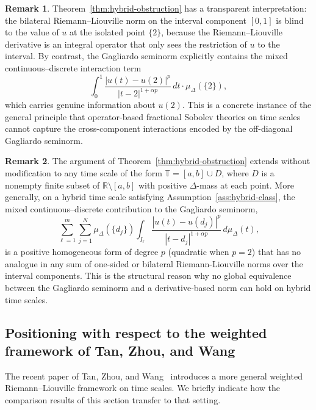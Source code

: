 \documentclass[11pt,a4paper]{article}
\numberwithin{equation}{section}
\theoremstyle{definition}
\newtheorem{remark}[remark]{Remark}
\newcommand{\R}{\mathbb{R}}
\newcommand{\T}{\mathbb{T}}
\begin{document}
\begin{remark}\label{rem:obstruction-interpretation}
Theorem~\ref{thm:hybrid-obstruction} has a transparent interpretation:
the bilateral Riemann--Liouville norm on the interval component
$[0,1]$ is blind to the value of $u$ at the isolated point $\{2\}$,
because the Riemann--Liouville derivative is an integral operator
that only sees the restriction of $u$ to the interval. By contrast,
the Gagliardo seminorm explicitly contains the mixed
continuous--discrete interaction term
\[
\int_0^1 \frac{|u(t) - u(2)|^p}{|t - 2|^{1+\alpha p}} \, dt \cdot \mu_\Delta(\{2\}),
\]
which carries genuine information about $u(2)$. This is a concrete
instance of the general principle that operator-based fractional
Sobolev theories on time scales cannot capture the cross-component
interactions encoded by the off-diagonal Gagliardo seminorm.
\end{remark}

\begin{remark}\label{rem:obstruction-general}
The argument of Theorem~\ref{thm:hybrid-obstruction} extends without
modification to any time scale of the form $\T = [a, b] \cup D$, where
$D$ is a nonempty finite subset of $\R \setminus [a, b]$ with positive
$\Delta$-mass at each point. More generally, on a hybrid time scale
satisfying Assumption~\ref{ass:hybrid-class}, the mixed
continuous--discrete contribution to the Gagliardo seminorm,
\[
\sum_{\ell=1}^{m} \sum_{j=1}^{N}
  \mu_\Delta(\{d_j\}) \int_{I_\ell}
    \frac{|u(t) - u(d_j)|^p}{|t - d_j|^{1+\alpha p}} \, d\mu_\Delta(t),
\]
is a positive homogeneous form of degree $p$ (quadratic when $p=2$)
that has no analogue in any sum of one-sided or bilateral
Riemann-Liouville norms over the interval components. This is the structural reason why no global equivalence
between the Gagliardo seminorm and a derivative-based norm can hold on
hybrid time scales.
\end{remark}

\subsection{Positioning with respect to the weighted framework of Tan, Zhou, and Wang}\label{subsec:TZW}

The recent paper of Tan, Zhou, and Wang~\cite{TanZhouWang2025}
introduces a more general weighted Riemann--Liouville framework on
time scales. We briefly indicate how the comparison results of this
section transfer to that setting.

\medskip
\end{document}
